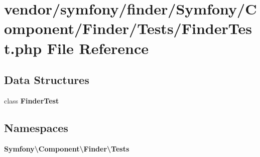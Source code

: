 \section{vendor/symfony/finder/\+Symfony/\+Component/\+Finder/\+Tests/\+Finder\+Test.php File Reference}
\label{_finder_test_8php}
\subsection*{Data Structures}
\begin{DoxyCompactItemize}
\item 
class {\bf Finder\+Test}
\end{DoxyCompactItemize}
\subsection*{Namespaces}
\begin{DoxyCompactItemize}
\item 
 {\bf Symfony\textbackslash{}\+Component\textbackslash{}\+Finder\textbackslash{}\+Tests}
\end{DoxyCompactItemize}
